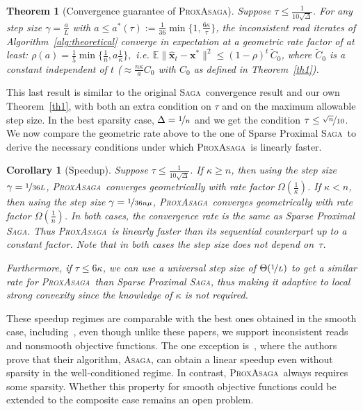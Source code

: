 \documentclass{article}
\def\EE{{\mathbb E}}
\newcommand{\PASAGA}{\textsc{ProxAsaga}}
\newcommand{\SAGA}{\textsc{Saga}}
\newcommand{\ASAGA}{\textsc{Asaga}}
\def\xx{{\boldsymbol x}}
\newtheorem{theorem}{Theorem}
\newtheorem{corollary}{Corollary}
\begin{document}
\begin{theorem}[Convergence guarantee of \PASAGA]\label{thm:convergence}
	Suppose $\tau \leq \frac{1}{10 \sqrt{\Delta}}$.
	For any step size $\gamma = \frac{a}{L}$ with $a \leq a^*(\tau) := \frac{1}{36} \min\{1, \frac{6 \kappa}{\tau}\}$, the inconsistent read iterates of Algorithm~\ref{alg:theoretical} converge in expectation at a geometric rate factor of at least: $\rho(a) = \frac{1}{5} \min \big\{\frac{1}{n},  a \frac{1}{\kappa}\big\},$
	i.e. $\EE \|\hat{\xx}_t-\xx^*\|^2 \leq (1-\rho)^t \,  \tilde C_0$, where $\tilde C_0$ is a constant independent of $t$ ($\approx \frac{n \kappa}{a}C_0$ with $C_0$ as defined in Theorem~\ref{th1}).
\end{theorem}
%
%
This last result is similar to the original \SAGA\ convergence result and our own Theorem~\ref{th1}, with both an extra condition on $\tau$ and on the maximum allowable step size. In the best sparsity case, $\Delta = \nicefrac{1}{n}$ and we get the condition $\tau \leq \nicefrac{\sqrt{n}}{10}$.
We now compare the geometric rate above to the one of Sparse Proximal \SAGA\ to derive the necessary conditions under which \PASAGA\ is linearly faster.

\begin{corollary}[Speedup]\label{thm:corollary}
	Suppose $\tau \leq \frac{1}{10 \sqrt{\Delta}}$.
	If $\kappa \geq n$, then using the step size $\gamma = \nicefrac{1}{36 L}$, \PASAGA\ converges geometrically with rate factor $\Omega(\frac{1}{\kappa})$.
	If $\kappa < n$, then using the step size $\gamma = \nicefrac{1}{36 n \mu}$, \PASAGA\ converges geometrically with rate factor $\Omega(\frac{1}{n})$.
	In both cases, the convergence rate is the same as Sparse Proximal \SAGA. Thus \PASAGA\ is linearly faster than its sequential counterpart up to a constant factor. Note that in both cases \emph{the step size does not depend on~$\tau$}.

	Furthermore, if $\tau \leq 6 \kappa$, we can use a universal step size of $\Theta(\nicefrac{1}{L})$ to get a similar rate for \PASAGA\ than Sparse Proximal \SAGA, thus making it adaptive to local strong convexity since the knowledge of $\kappa$ is not required.
\end{corollary}

These speedup regimes are comparable with the best ones obtained in the smooth case, including~\citet{hogwild2011,reddi2015variance}, even though unlike these papers, we support inconsistent reads and nonsmooth objective functions.
The one exception is~\citet{leblond2016Asaga}, where the authors prove that their algorithm, \ASAGA, can obtain a linear speedup even without sparsity in the well-conditioned regime.
In contrast, \PASAGA\ always requires some sparsity.
Whether this property for smooth objective functions could be extended to the composite case remains an open problem.
\end{document}

